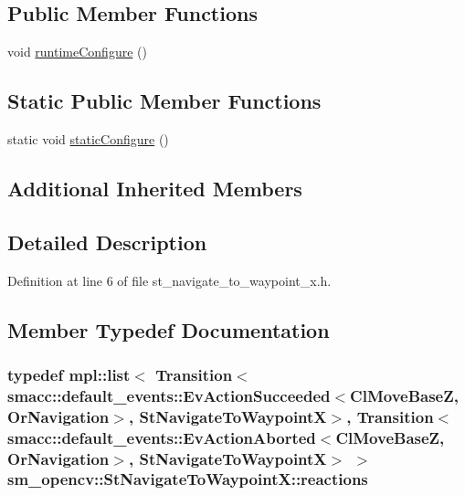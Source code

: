 \subsection*{Public Member Functions}
\begin{DoxyCompactItemize}
\item 
void \hyperlink{structsm__opencv_1_1StNavigateToWaypointX_a33d6eaf7751ac344d92b226ecdedb8cf}{runtime\+Configure} ()
\end{DoxyCompactItemize}
\subsection*{Static Public Member Functions}
\begin{DoxyCompactItemize}
\item 
static void \hyperlink{structsm__opencv_1_1StNavigateToWaypointX_a6a4b24a8fbf938df515162555247b246}{static\+Configure} ()
\end{DoxyCompactItemize}
\subsection*{Additional Inherited Members}


\subsection{Detailed Description}


Definition at line 6 of file st\+\_\+navigate\+\_\+to\+\_\+waypoint\+\_\+x.\+h.



\subsection{Member Typedef Documentation}
\subsubsection[{\texorpdfstring{reactions}{reactions}}]{\setlength{\rightskip}{0pt plus 5cm}typedef mpl\+::list$<$ Transition$<${\bf smacc\+::default\+\_\+events\+::\+Ev\+Action\+Succeeded}$<${\bf Cl\+Move\+BaseZ}, {\bf Or\+Navigation}$>$, {\bf St\+Navigate\+To\+WaypointX}$>$, Transition$<${\bf smacc\+::default\+\_\+events\+::\+Ev\+Action\+Aborted}$<${\bf Cl\+Move\+BaseZ}, {\bf Or\+Navigation}$>$, {\bf St\+Navigate\+To\+WaypointX}$>$ $>$ {\bf sm\+\_\+opencv\+::\+St\+Navigate\+To\+Waypoint\+X\+::reactions}}\hypertarget{structsm__opencv_1_1StNavigateToWaypointX_a451d43b5b970f286d9f3d14ac1210a4c}{}\label{structsm__opencv_1_1StNavigateToWaypointX_a451d43b5b970f286d9f3d14ac1210a4c}


